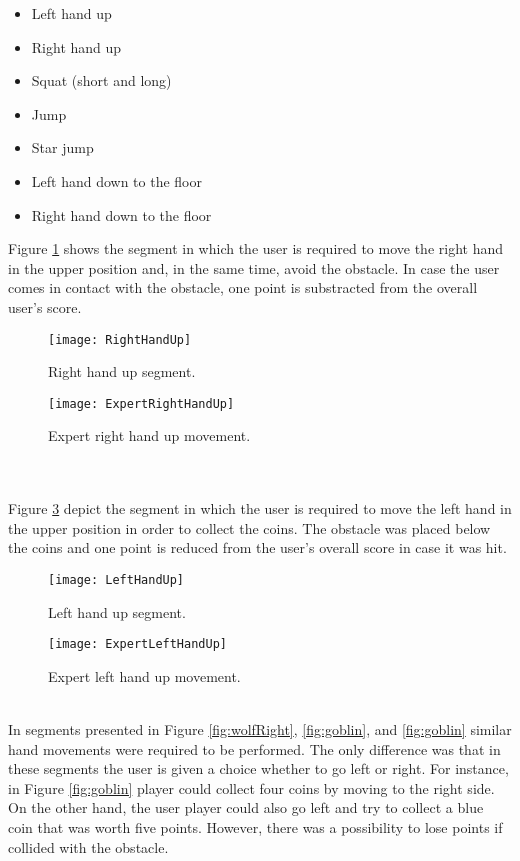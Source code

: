 \begin{itemize}
\item Left hand up
\item Right hand up
\item Squat (short and long)
\item Jump
\item Star jump
\item Left hand down to the floor
\item Right hand down to the floor
\end{itemize}
Figure \ref{fig:rightup} shows the segment in which the user is required to move the right hand in the upper position and, in the same time, avoid the obstacle. In case the user comes in contact with the obstacle, one point is substracted from the overall user's score.\\
\begin{figure}[h]
    \centering
    \texttt{[image: RightHandUp]}
    \caption{Right hand up segment.}
    \label{fig:rightup}
\end{figure}
\begin{figure}[h]
    \centering
    \texttt{[image: ExpertRightHandUp]}
    \caption{Expert right hand up movement.}
    \label{fig:rightHandUp}
\end{figure}\\\\
Figure \ref{fig:leftup} depict the segment in which the user is required to move the left hand in the upper position in order to collect the coins. The obstacle was placed below the coins and one point is reduced from the user's overall score in case it was hit.\\
\begin{figure}[h]
    \centering
    \texttt{[image: LeftHandUp]}
    \caption{Left hand up segment.}
    \label{fig:leftup}
\end{figure}
\begin{figure}[h]
    \centering
    \texttt{[image: ExpertLeftHandUp]}
    \caption{Expert left hand up movement.}
    \label{fig:leftHandUp}
\end{figure}\\
In segments presented in Figure \ref{fig:wolfRight},  \ref{fig:goblin}, and \ref{fig:goblin} similar hand movements were required to be performed. The only difference was that in these segments the user is given a choice whether to go left or right. For instance, in Figure \ref{fig:goblin} player could collect four coins by moving to the right side. On the other hand, the user player could also go left and try to collect a blue coin that was worth five points. However, there was a possibility to lose points if collided with the obstacle.\\
